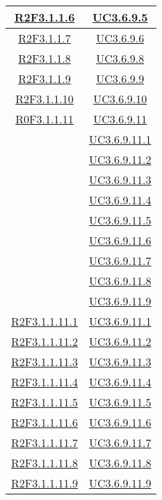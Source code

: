 \begin{longtable}{|c|c|}
\hline
\hyperlink{R2F3.1.1.6}{R2F3.1.1.6} & \hyperlink{UC3.6.9.5}{UC3.6.9.5}\\
\hline
\hyperlink{R2F3.1.1.7}{R2F3.1.1.7} & \hyperlink{UC3.6.9.6}{UC3.6.9.6}\\
\hline
\hyperlink{R2F3.1.1.8}{R2F3.1.1.8} & \hyperlink{UC3.6.9.8}{UC3.6.9.8}\\
\hline
\hyperlink{R2F3.1.1.9}{R2F3.1.1.9} & \hyperlink{UC3.6.9.9}{UC3.6.9.9}\\
\hline
\hyperlink{R2F3.1.1.10}{R2F3.1.1.10} & \hyperlink{UC3.6.9.10}{UC3.6.9.10}\\
\hline
\hyperlink{R0F3.1.1.11}{R0F3.1.1.11} & \hyperlink{UC3.6.9.11}{UC3.6.9.11}\\
& \hyperlink{UC3.6.9.11.1}{UC3.6.9.11.1}\\
& \hyperlink{UC3.6.9.11.2}{UC3.6.9.11.2}\\
& \hyperlink{UC3.6.9.11.3}{UC3.6.9.11.3}\\
& \hyperlink{UC3.6.9.11.4}{UC3.6.9.11.4}\\
& \hyperlink{UC3.6.9.11.5}{UC3.6.9.11.5}\\
& \hyperlink{UC3.6.9.11.6}{UC3.6.9.11.6}\\
& \hyperlink{UC3.6.9.11.7}{UC3.6.9.11.7}\\
& \hyperlink{UC3.6.9.11.8}{UC3.6.9.11.8}\\
& \hyperlink{UC3.6.9.11.9}{UC3.6.9.11.9}\\
\hline
\hyperlink{R2F3.1.1.11.1}{R2F3.1.1.11.1} & \hyperlink{UC3.6.9.11.1}{UC3.6.9.11.1}\\
\hline
\hyperlink{R2F3.1.1.11.2}{R2F3.1.1.11.2} & \hyperlink{UC3.6.9.11.2}{UC3.6.9.11.2}\\
\hline
\hyperlink{R2F3.1.1.11.3}{R2F3.1.1.11.3} & \hyperlink{UC3.6.9.11.3}{UC3.6.9.11.3}\\
\hline
\hyperlink{R2F3.1.1.11.4}{R2F3.1.1.11.4} & \hyperlink{UC3.6.9.11.4}{UC3.6.9.11.4}\\
\hline
\hyperlink{R2F3.1.1.11.5}{R2F3.1.1.11.5} & \hyperlink{UC3.6.9.11.5}{UC3.6.9.11.5}\\
\hline
\hyperlink{R2F3.1.1.11.6}{R2F3.1.1.11.6} & \hyperlink{UC3.6.9.11.6}{UC3.6.9.11.6}\\
\hline
\hyperlink{R2F3.1.1.11.7}{R2F3.1.1.11.7} & \hyperlink{UC3.6.9.11.7}{UC3.6.9.11.7}\\
\hline
\hyperlink{R2F3.1.1.11.8}{R2F3.1.1.11.8} & \hyperlink{UC3.6.9.11.8}{UC3.6.9.11.8}\\
\hline
\hyperlink{R2F3.1.1.11.9}{R2F3.1.1.11.9} & \hyperlink{UC3.6.9.11.9}{UC3.6.9.11.9}\\

\end{longtable}
